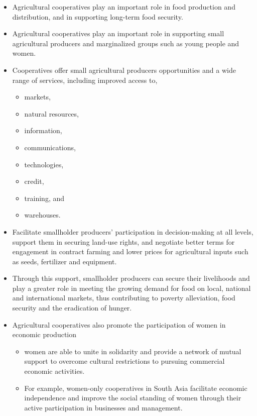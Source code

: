 \documentclass[12pt,ignorenonframetext,aspectratio=169]{beamer}
\providecommand{\tightlist}{%
  \setlength{\itemsep}{0pt}\setlength{\parskip}{0pt}}
\begin{document}
\begin{frame}{}
\protect\hypertarget{section-5}{}
\footnotesize

\begin{itemize}
\tightlist
\item
  Agricultural cooperatives play an important role in food production
  and distribution, and in supporting long-term food security.
\item
  Agricultural cooperatives play an important role in supporting small
  agricultural producers and marginalized groups such as young people
  and women.
\item
  Cooperatives offer small agricultural producers opportunities and a
  wide range of services, including improved access to,

  \begin{itemize}
  \tightlist
  \item
    markets,
  \item
    natural resources,
  \item
    information,
  \item
    communications,
  \item
    technologies,
  \item
    credit,
  \item
    training, and
  \item
    warehouses.
  \end{itemize}
\end{itemize}
\end{frame}

\begin{frame}{}
\protect\hypertarget{section-6}{}
\footnotesize

\begin{itemize}
\tightlist
\item
  Facilitate smallholder producers' participation in decision-making at
  all levels, support them in securing land-use rights, and negotiate
  better terms for engagement in contract farming and lower prices for
  agricultural inputs such as seeds, fertilizer and equipment.
\item
  Through this support, smallholder producers can secure their
  livelihoods and play a greater role in meeting the growing demand for
  food on local, national and international markets, thus contributing
  to poverty alleviation, food security and the eradication of hunger.
\item
  Agricultural cooperatives also promote the participation of women in
  economic production

  \begin{itemize}
  \tightlist
  \item
    women are able to unite in solidarity and provide a network of
    mutual support to overcome cultural restrictions to pursuing
    commercial economic activities.
  \item
    For example, women-only cooperatives in South Asia facilitate
    economic independence and improve the social standing of women
    through their active participation in businesses and management.
  \end{itemize}
\end{itemize}
\end{frame}
\end{document}

